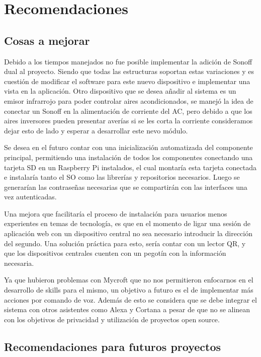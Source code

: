 \chapter{Recomendaciones}

\section{Cosas a mejorar}

Debido a los tiempos manejados no fue posible implementar la adición de Sonoff dual al proyecto. Siendo que todas las estructuras soportan estas variaciones y es cuestión de modificar el software para este nuevo dispositivo e implementar una vista en la aplicación.
Otro dispositivo que se desea añadir al sistema es un emisor infrarrojo para poder controlar aires acondicionados, se manejó la idea de conectar un Sonoff en la alimentación de corriente del AC, pero debido a que los aires inversores pueden presentar averías si se les corta la corriente consideramos dejar esto de lado y esperar a desarrollar este nevo módulo.

Se desea en el futuro contar con una inicialización automatizada del componente principal, permitiendo una instalación de todos los componentes conectando una tarjeta SD en un Raspberry Pi instalados, el cual montaría esta tarjeta conectada e instalaría tanto el SO como las librerías y repositorios necesarios. Luego se generarían las contraseñas necesarias que se compartirán con las interfaces una vez autenticadas.

Una mejora que facilitaría el proceso de instalación para usuarios menos experientes en temas de tecnología, es que en el momento de ligar una sesión de aplicación web con un dispositivo central no sea necesario introducir la dirección del segundo. Una solución práctica para esto, sería contar con un lector QR, y que los dispositivos centrales cuenten con un pegotín con la información necesaria.

Ya que hubieron problemas con Mycroft que no nos permitieron enfocarnos en el desarrollo de skills para el mismo, un objetivo a futuro es el de implementar más acciones por comando de voz. Además de esto se considera que se debe integrar el sistema con otros asistentes como Alexa y Cortana a pesar de que no se alinean con los objetivos de privacidad y utilización de proyectos open source.

\section{Recomendaciones para futuros proyectos}
